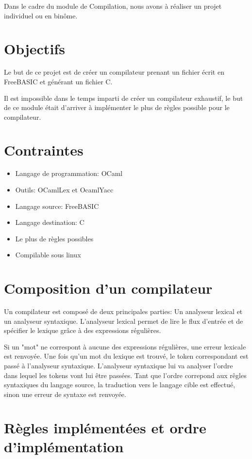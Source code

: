 Dans le cadre du module de Compilation, nous avons à réaliser un projet individuel ou en binôme.

\section{Objectifs}

Le but de ce projet est de créer un compilateur prenant un fichier écrit en FreeBASIC et générant un fichier C.

Il est impossible dans le temps imparti de créer un compilateur exhaustif, le but de ce module était d'arriver à implémenter le plus de règles possible pour le compilateur.


\section{Contraintes}

\begin{itemize}

\item Langage de programmation: OCaml
\item Outils: OCamlLex et OcamlYacc
\item Langage source: FreeBASIC
\item Langage destination: C
\item Le plus de règles possibles
\item Compilable sous linux

\end{itemize}

\section{Composition d'un compilateur}
Un compilateur est composé de deux principales parties: Un analyseur lexical et un analyseur syntaxique. L'analyseur lexical permet de lire le flux d'entrée et de spécifier le lexique grâce à des expressions régulières. 

Si un "mot" ne correspont à aucune des expressions régulières, une erreur lexicale est renvoyée. Une fois qu'un mot du lexique est trouvé, le token correspondant est passé à l'analyseur syntaxique. L'analyseur syntaxique lui va analyser l'ordre dans lequel les tokens vont lui être passées. Tant que l'ordre correpond aux rêgles syntaxiques du langage source, la traduction vers le langage cible est effectué, sinon une erreur de syntaxe est renvoyée. 

\section{Règles implémentées et ordre d'implémentation}

